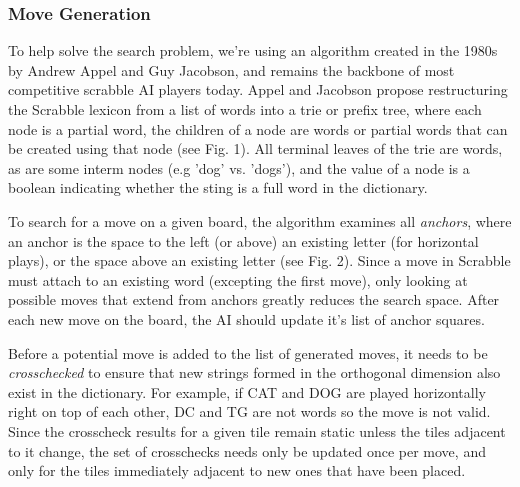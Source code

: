 \documentclass[12pt]{article}
\begin{document}
\subsubsection{Move Generation}
To help solve the search problem, we're using an algorithm created in
the 1980s by Andrew Appel and Guy Jacobson, and remains the backbone
of most competitive scrabble AI players today. Appel and Jacobson
propose restructuring the Scrabble lexicon from a list of words into a
trie or prefix tree, where each node is a partial word, the children
of a node are words or partial words that can be created using that
node (see Fig. 1). All terminal leaves of the trie are words, as are
some interm nodes (e.g 'dog' vs. 'dogs'), and the value of a node is a
boolean indicating whether the sting is a full word in the dictionary.
  
To search for a move on a given board, the algorithm examines all
\emph{anchors}, where an anchor is the space to the left (or above) an
existing letter (for horizontal plays), or the space above an existing
letter (see Fig. 2). Since a move in Scrabble must attach to an
existing word (excepting the first move), only looking at possible
moves that extend from anchors greatly reduces the search space. After
each new move on the board, the AI should update it's list of anchor
squares.

Before a potential move is added to the list of generated moves, it
needs to be \emph{crosschecked} to ensure that new strings formed in
the orthogonal dimension also exist in the dictionary. For example, if
CAT and DOG are played horizontally right on top of each other, DC and
TG are not words so the move is not valid.  Since the crosscheck
results for a given tile remain static unless the tiles adjacent to it
change, the set of crosschecks needs only be updated once per move,
and only for the tiles immediately adjacent to new ones that have been
placed.
\end{document}
